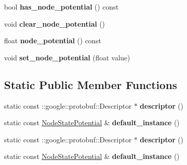 \begin{DoxyCompactItemize}
\item 
\hypertarget{classgraph_1_1NodeStatePotential_a2ef72c30a1c13aa21170eef7a43bde34}{
bool {\bfseries has\_\-node\_\-potential} () const }
\label{classgraph_1_1NodeStatePotential_a2ef72c30a1c13aa21170eef7a43bde34}

\item 
\hypertarget{classgraph_1_1NodeStatePotential_aac3b8f48c1b6320a6381a16d8743073e}{
void {\bfseries clear\_\-node\_\-potential} ()}
\label{classgraph_1_1NodeStatePotential_aac3b8f48c1b6320a6381a16d8743073e}

\item 
\hypertarget{classgraph_1_1NodeStatePotential_a69e4cc64ea70c2153167a1c0f738bfbd}{
float {\bfseries node\_\-potential} () const }
\label{classgraph_1_1NodeStatePotential_a69e4cc64ea70c2153167a1c0f738bfbd}

\item 
\hypertarget{classgraph_1_1NodeStatePotential_a68c6f680cb958390f116dcabb4c0a007}{
void {\bfseries set\_\-node\_\-potential} (float value)}
\label{classgraph_1_1NodeStatePotential_a68c6f680cb958390f116dcabb4c0a007}

\end{DoxyCompactItemize}
\subsection*{Static Public Member Functions}
\begin{DoxyCompactItemize}
\item 
\hypertarget{classgraph_1_1NodeStatePotential_a5f6ce554fba782fde014857a38f07872}{
static const ::google::protobuf::Descriptor $\ast$ {\bfseries descriptor} ()}
\label{classgraph_1_1NodeStatePotential_a5f6ce554fba782fde014857a38f07872}

\item 
\hypertarget{classgraph_1_1NodeStatePotential_ac6e718a6724be0f218338af78a5cdb4e}{
static const \hyperlink{classgraph_1_1NodeStatePotential}{NodeStatePotential} \& {\bfseries default\_\-instance} ()}
\label{classgraph_1_1NodeStatePotential_ac6e718a6724be0f218338af78a5cdb4e}

\item 
\hypertarget{classgraph_1_1NodeStatePotential_a376b2186e41466cbaa8dfdb45d5458b0}{
static const ::google::protobuf::Descriptor $\ast$ {\bfseries descriptor} ()}
\label{classgraph_1_1NodeStatePotential_a376b2186e41466cbaa8dfdb45d5458b0}

\item 
\hypertarget{classgraph_1_1NodeStatePotential_a7a7d219bf423b094346b3fd9effb8658}{
static const \hyperlink{classgraph_1_1NodeStatePotential}{NodeStatePotential} \& {\bfseries default\_\-instance} ()}
\label{classgraph_1_1NodeStatePotential_a7a7d219bf423b094346b3fd9effb8658}

\end{DoxyCompactItemize}
